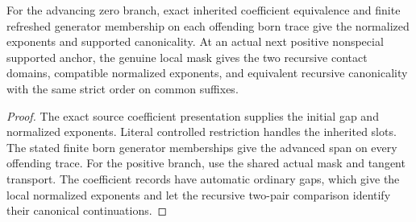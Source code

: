 \begin{theorem}
\label{hir:g1-advancing-supported-coefficient-witnesses}
\leanok
For the advancing zero branch, exact inherited coefficient
equivalence and finite refreshed generator membership on each
offending born trace give the normalized exponents and supported
canonicality. At an actual next positive nonspecial supported
anchor, the genuine local mask gives the two recursive contact
domains, compatible normalized exponents, and equivalent
recursive canonicality with the same strict order on common suffixes.
\end{theorem}
\begin{proof}
The exact source coefficient presentation supplies the initial
gap and normalized exponents. Literal controlled restriction
handles the inherited slots. The stated finite born generator
memberships give the advanced span on every offending trace.
For the positive branch, use the shared actual mask and tangent
transport. The coefficient records have automatic ordinary gaps,
which give the local normalized exponents and let the recursive
two-pair comparison identify their canonical continuations.
\end{proof}

